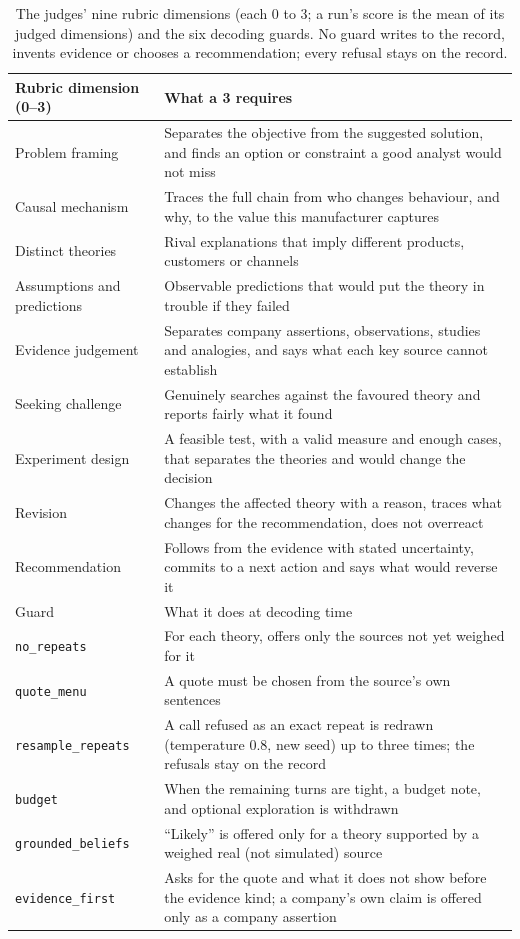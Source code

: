 \documentclass[11pt]{article}
\begin{document}
\begin{table}[h]
\centering
\small
\begin{tabular}{p{3.0cm}p{12.1cm}}
\toprule
Rubric dimension (0--3) & What a 3 requires \\
\midrule
Problem framing & Separates the objective from the suggested solution, and finds an option or constraint a good analyst would not miss \\
Causal mechanism & Traces the full chain from who changes behaviour, and why, to the value this manufacturer captures \\
Distinct theories & Rival explanations that imply different products, customers or channels \\
Assumptions and predictions & Observable predictions that would put the theory in trouble if they failed \\
Evidence judgement & Separates company assertions, observations, studies and analogies, and says what each key source cannot establish \\
Seeking challenge & Genuinely searches against the favoured theory and reports fairly what it found \\
Experiment design & A feasible test, with a valid measure and enough cases, that separates the theories and would change the decision \\
Revision & Changes the affected theory with a reason, traces what changes for the recommendation, does not overreact \\
Recommendation & Follows from the evidence with stated uncertainty, commits to a next action and says what would reverse it \\
\midrule
Guard & What it does at decoding time \\
\midrule
\texttt{no\_repeats} & For each theory, offers only the sources not yet weighed for it \\
\texttt{quote\_menu} & A quote must be chosen from the source's own sentences \\
\texttt{resample\_repeats} & A call refused as an exact repeat is redrawn (temperature 0.8, new seed) up to three times; the refusals stay on the record \\
\texttt{budget} & When the remaining turns are tight, a budget note, and optional exploration is withdrawn \\
\texttt{grounded\_beliefs} & ``Likely'' is offered only for a theory supported by a weighed real (not simulated) source \\
\texttt{evidence\_first} & Asks for the quote and what it does not show before the evidence kind; a company's own claim is offered only as a company assertion \\
\bottomrule
\end{tabular}
\caption{The judges' nine rubric dimensions (each 0 to 3; a run's score is the mean of its judged dimensions) and the six decoding guards. No guard writes to the record, invents evidence or chooses a recommendation; every refusal stays on the record.}
\end{table}
\end{document}
